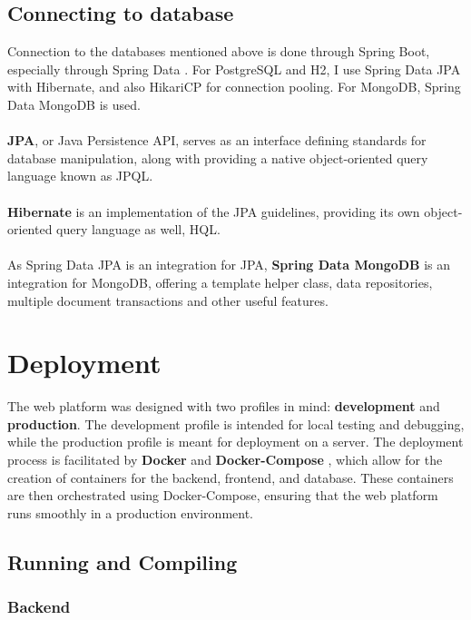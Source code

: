 \subsection{Connecting to database}

\noindent Connection to the databases mentioned above is done through Spring Boot, especially through Spring Data \cite{spring-data}. For PostgreSQL and H2, I use Spring Data JPA with Hibernate, and also HikariCP \cite{hikaricp} for connection pooling. For MongoDB, Spring Data MongoDB is used.
\\\\
\noindent \textbf{JPA}, or Java Persistence API, serves as an interface defining standards for database manipulation, along with providing a native object-oriented query language known as JPQL.
\\\\
\noindent \textbf{Hibernate} is an implementation of the JPA guidelines, providing its own object-oriented query language as well, HQL.
\\\\
\noindent As Spring Data JPA is an integration for JPA, \textbf{Spring Data MongoDB} is an integration for MongoDB, offering a template helper class, data repositories, multiple document transactions and other useful features. 

\section{Deployment}

The web platform was designed with two profiles in mind: \textbf{development} and \textbf{production}. The development profile is intended for local testing and debugging, while the production profile is meant for deployment on a server. The deployment process is facilitated by \textbf{Docker} \cite{docker} and \textbf{Docker-Compose} \cite{docker-compose}, which allow for the creation of containers for the backend, frontend, and database. These containers are then orchestrated using Docker-Compose, ensuring that the web platform runs smoothly in a production environment.

\subsection{Running and Compiling}

\subsubsection{Backend}

